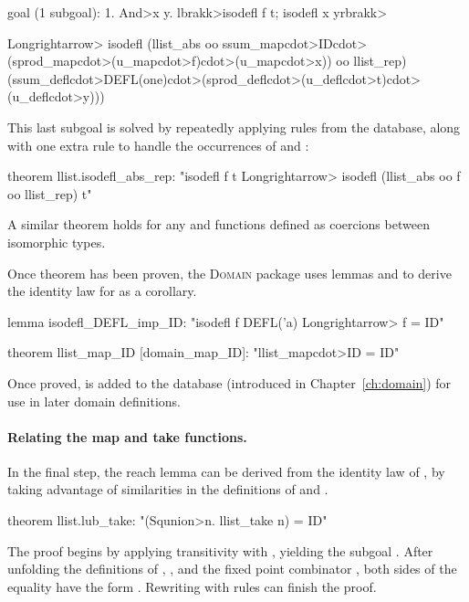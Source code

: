 \begin{isacode}
goal (1 subgoal):
 1. \<And>x y. \<lbrakk>isodefl f t; isodefl x y\<rbrakk>
\end{isacode}
\pagebreak
\begin{isacode}
          \<Longrightarrow> isodefl
              (llist_abs oo
               ssum_map\<cdot>ID\<cdot>(sprod_map\<cdot>(u_map\<cdot>f)\<cdot>(u_map\<cdot>x)) oo llist_rep)
              (ssum_defl\<cdot>DEFL(one)\<cdot>(sprod_defl\<cdot>(u_defl\<cdot>t)\<cdot>(u_defl\<cdot>y)))
\end{isacode}
%
This last subgoal is solved by repeatedly applying rules from the  database, along with one extra rule to handle the occurrences of  and :
%
\begin{isacode}
theorem llist.isodefl_abs_rep:
  "isodefl f t \<Longrightarrow> isodefl (llist_abs oo f oo llist_rep) t"
\end{isacode}
%
A similar theorem holds for any  and  functions defined as coercions between isomorphic types.

Once theorem  has been proven, the \textsc{Domain} package uses lemmas  and  to derive the identity law for  as a corollary.
%
\begin{isacode}
lemma isodefl_DEFL_imp_ID: "isodefl f DEFL('a) \<Longrightarrow> f = ID"
\end{isacode}
\unmedskip
{}
\begin{isacode}
theorem llist_map_ID [domain_map_ID]: "llist_map\<cdot>ID = ID"
\end{isacode}
%
Once proved,  is added to the  database (introduced in Chapter~\ref{ch:domain}) for use in later domain definitions.

\paragraph{Relating the map and take functions.}

In the final step, the reach lemma can be derived from the identity law of , by taking advantage of similarities in the definitions of  and .
%
\begin{isacode}
theorem llist.lub_take: "(\<Squnion>n. llist_take n) = ID"
\end{isacode}
%
The proof begins by applying transitivity with , yielding the subgoal 
 . After unfolding the definitions of , , and the fixed point combinator , both sides of the equality have the form . Rewriting with  rules can finish the proof.

